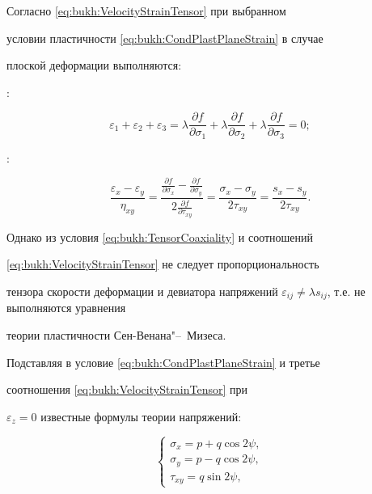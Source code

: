Согласно \eqref{eq:bukh:VelocityStrainTensor} при выбранном

условии пластичности \eqref{eq:bukh:CondPlastPlaneStrain} в случае

плоской деформации выполняются:



:

$$

\varepsilon_1+\varepsilon_2+\varepsilon_3= \lambda\frac{\partial

f}{\partial\sigma_1}+ \lambda\frac{\partial

f}{\partial\sigma_2}+\lambda\frac{\partial f}{\partial\sigma_3}=0;

$$

:

\begin{equation}\label{eq:bukh:TensorCoaxiality}

\frac{\varepsilon_x-\varepsilon_y}{\eta_{xy}}=

\frac{\frac{\partial f}{\partial\sigma_x}-\frac{\partial

f}{\partial\sigma_y}}{2\frac{\partial

f}{\partial\tau_{xy}}}=\frac{\sigma_x-\sigma_y}{2\tau_{xy}}=\frac{s_x-s_y}{2\tau_{xy}}.

\end{equation}

Однако из условия \eqref{eq:bukh:TensorCoaxiality} и соотношений

\eqref{eq:bukh:VelocityStrainTensor} не следует пропорциональность

тензора скорости деформации и девиатора напряжений $

\varepsilon_{ij}\neq\lambda s_{ij}$, т.е. не выполняются уравнения

теории пластичности Сен-Венана"--~Мизеса.



Подставляя в условие \eqref{eq:bukh:CondPlastPlaneStrain} и третье

соотношения \eqref{eq:bukh:VelocityStrainTensor} при

$\varepsilon_z=0$ известные формулы теории напряжений:

\begin{equation*}

\begin{cases}

\sigma_x =p+q\cos2\psi,\\

\sigma_y =p-q\cos2\psi,\\

\tau_{xy} =q\sin2\psi,

\end{cases}\end{equation*}


